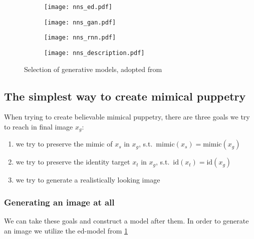 \begin{figure}[htp]
    \captionsetup[subfigure]{justification=centering}
    \centering
    \begin{minipage}[s][3.3cm]{.23\columnwidth}
        \begin{subfigure}{\columnwidth}
            \texttt{[image: nns\_ed.pdf]}
            \caption{}\label{subfig:ed}
        \end{subfigure}
        \vfil
        \begin{subfigure}{\columnwidth}
            \texttt{[image: nns\_gan.pdf]}
            \caption{}\label{subfig:gan}
        \end{subfigure}
    \end{minipage}
    \begin{subfigure}{.2\columnwidth}
        \texttt{[image: nns\_rnn.pdf]}
        \caption{}\label{subfig:rnn}
    \end{subfigure}
    \begin{minipage}[s][3.7cm]{.17\columnwidth}
        \begin{subfigure}{\columnwidth}
            \texttt{[image: nns\_description.pdf]}
        \end{subfigure}\vfil
    \end{minipage}
    \caption{Selection of generative models, adopted from~\cite{Mirsky.2020}}\label{fig:generative-models}
\end{figure}
\subsection{The simplest way to create mimical puppetry}
When trying to create believable mimical puppetry, there are three goals
we try to reach in final image \(x_g\):
\begin{enumerate}[1.)]
    \item we try to preserve the mimic of \(x_s\) in \(x_g\), s.t.\ \(\text{mimic}(x_s)=\text{mimic}(x_g)\)\label{goal:mimic-perservation}
    \item we try to preserve the identity target \(x_t\) in \(x_g\), s.t.\ \(\text{id}(x_t)=\text{id}(x_g)\)\label{goal:preserve-identity}
    \item we try to generate a realistically looking image\label{goal:increase-realism}
\end{enumerate}
\subsubsection{Generating an image at all}
We can take these goals and construct a model after them. In order to generate
an image we utilize the \gls{ed}-model from \cref{subfig:ed}

